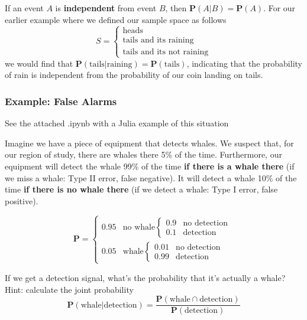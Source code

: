 \documentclass{article}
\begin{document}
If an event $A$ is \textbf{independent} from event $B$, then $\mathbf{P}(A|B) = \mathbf{P}(A)$. For our earlier example where we defined our sample space as follows
\begin{equation}
\label{eq:5}
S =
\begin{cases}
  \text{heads} \\
  \text{tails and its raining} \\
  \text{tails and its not raining}
\end{cases}
\end{equation}
we would find that $\mathbf{P}(\text{tails}|\text{raining}) = \mathbf{P}(\text{tails})$, indicating that the probability of rain is independent from the probability of our coin landing on tails.

\subsubsection{Example: False Alarms}
See the attached .ipynb with a Julia example of this situation

Imagine we have a piece of equipment that detects whales. We suspect that, for our region of study, there are whales there 5\% of the time. Furthermore, our equipment will detect the whale 99\% of the time \textbf{if there is a whale there} (if we miss a whale: Type II error, false negative). It will detect a whale 10\% of the time \textbf{if there is no whale there} (if we detect a whale: Type I error, false positive).

\begin{equation}
\label{eq:8}
\mathbf{P} = 
\begin{cases}
  0.95 & \text{no whale} \begin{cases}
                              0.9 & \text{no detection} \\
                              0.1 & \text{detection} 
                              \end{cases} \\
  0.05 & \text{whale} \begin{cases}
                              0.01 & \text{no detection} \\
                              0.99 & \text{detection} 
                              \end{cases}
 \end{cases}
\end{equation}

If we get a detection signal, what's the probability that it's actually a whale?
Hint: calculate the joint probability 
\begin{equation}
\label{eq:10}
\mathbf{P}(\text{whale} | \text{detection}) = \frac{\mathbf{P} (\text{whale} \cap \text{detection})}{\mathbf{P}(\text{detection})}
\end{equation}
\end{document}
